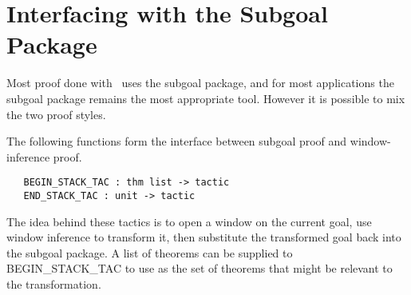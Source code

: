 \section{Interfacing with the Subgoal Package}

Most proof done with \HOL\ uses the subgoal package,
    and for most applications the subgoal package remains the most appropriate
    tool.
However it is possible to mix the two proof styles.

The following functions form the interface between subgoal proof and
window-inference proof.
\begin{boxed}\begin{verbatim}
   BEGIN_STACK_TAC : thm list -> tactic
   END_STACK_TAC : unit -> tactic
\end{verbatim}\end{boxed}
The idea behind these tactics is to open a window on the current goal,
use window inference to transform it, then substitute the transformed goal
back into the subgoal package.
A list of theorems can be supplied to {BEGIN\_STACK\_TAC} to use as the set
of theorems that might be relevant to the transformation.

